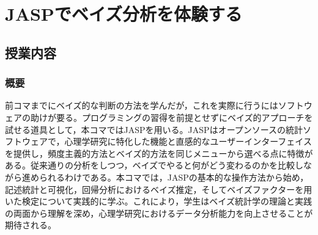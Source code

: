 \section{JASPでベイズ分析を体験する}
\label{b28_bayesian_with_jasp}

\subsection{授業内容}

\subsubsection{概要}
前コマまでにベイズ的な判断の方法を学んだが，これを実際に行うにはソフトウェアの助けが要る。プログラミングの習得を前提とせずにベイズ的アプローチを試せる道具として，本コマではJASPを用いる。JASPはオープンソースの統計ソフトウェアで，心理学研究に特化した機能と直感的なユーザーインターフェイスを提供し，頻度主義的方法とベイズ的方法を同じメニューから選べる点に特徴がある。従来通りの分析をしつつ，ベイズでやると何がどう変わるのかを比較しながら進められるわけである。本コマでは，JASPの基本的な操作方法から始め，記述統計と可視化，回帰分析におけるベイズ推定，そしてベイズファクターを用いた検定について実践的に学ぶ。これにより，学生はベイズ統計学の理論と実践の両面から理解を深め，心理学研究におけるデータ分析能力を向上させることが期待される。

